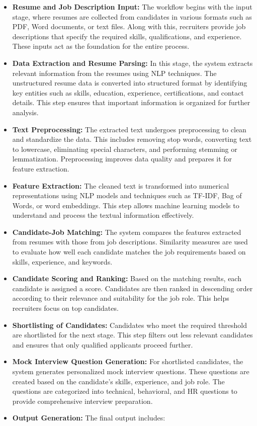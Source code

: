 \begin{itemize}
    \item \textbf{Resume and Job Description Input:}
    The workflow begins with the input stage, where resumes are collected from candidates in various formats such as PDF, Word documents, or text files. Along with this, recruiters provide job descriptions that specify the required skills, qualifications, and experience. These inputs act as the foundation for the entire process.
    \item \textbf{Data Extraction and Resume Parsing:} 
    In this stage, the system extracts relevant information from the resumes using NLP techniques. The unstructured resume data is converted into structured format by identifying key entities such as skills, education, experience, certifications, and contact details. This step ensures that important information is organized for further analysis.
    \item \textbf{Text Preprocessing:}
    The extracted text undergoes preprocessing to clean and standardize the data. This includes removing stop words, converting text to lowercase, eliminating special characters, and performing stemming or lemmatization. Preprocessing improves data quality and prepares it for feature extraction.
    \item \textbf{Feature Extraction:}
    The cleaned text is transformed into numerical representations using NLP models and techniques such as TF-IDF, Bag of Words, or word embeddings. This step allows machine learning models to understand and process the textual information effectively.
    \item \textbf{Candidate-Job Matching:}
    The system compares the features extracted from resumes with those from job descriptions. Similarity measures are used to evaluate how well each candidate matches the job requirements based on skills, experience, and keywords.
     \item \textbf{Candidate Scoring and Ranking:}
     Based on the matching results, each candidate is assigned a score. Candidates are then ranked in descending order according to their relevance and suitability for the job role. This helps recruiters focus on top candidates.
     \item \textbf{Shortlisting of Candidates:}
    Candidates who meet the required threshold are shortlisted for the next stage. This step filters out less relevant candidates and ensures that only qualified applicants proceed further.
    \item \textbf{Mock Interview Question Generation:}
    For shortlisted candidates, the system generates personalized mock interview questions. These questions are created based on the candidate’s skills, experience, and job role. The questions are categorized into technical, behavioral, and HR questions to provide comprehensive interview preparation.
    \item \textbf{Output Generation:}
    The final output includes:


\end{itemize}
